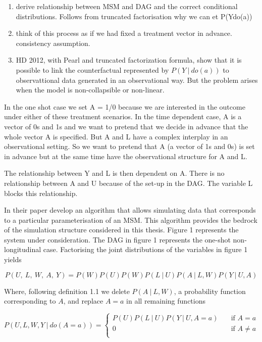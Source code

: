 \documentclass[11pt]{article}
\begin{document}
\begin{enumerate}
\def\labelenumi{\arabic{enumi}.}
\item
  derive relationship between MSM and DAG and the correct conditional
  distributions. Follows from truncated factorisation why we can et
  P(Y\textbar{}do(a))
\item
  think of this process as if we had fixed a treatment vector in
  advance. consistency assumption.
\item
  HD 2012, with Pearl and truncated factorization formula, show that it
  is possible to link the counterfactual represented by
  \(P(Y\ |\ do(a))\) to observattional data generated in an
  observational way. But the problem arises when the model is
  non-collapsible or non-linear.
\end{enumerate}

In the one shot case we set A = 1/0 because we are interested in the
outcome under either of these treatment scenarios. In the time dependent
case, A is a vector of 0s and 1s and we want to pretend that we decide
in advance that the whole vector A is specified. But A and L have a
complex interplay in an observational setting. So we want to pretend
that A (a vector of 1s and 0s) is set in advance but at the same time
have the observational structure for A and L.

The relationship between Y and L is then dependent on A. There is no
relationship between A and U because of the set-up in the DAG. The
variable L blocks this relationship.

In their paper \citet{Havercroft2012} develop an algorithm that allows
simulating data that corresponds to a particular parameterisation of an
MSM. This algorithm provides the bedrock of the simulation structure
considered in this thesis. Figure 1 represents the system under
consideration. The DAG in figure 1 represents the one-shot
non-longitudinal case. Factorising the joint distributions of the
variables in figure 1 yields

\[P(U,\ L,\ W,\ A,\ Y) = P(W)P(U)P(W)P(L\ |\ U)P(A\ |\ L,W)P(Y\ |\ U,A)\]

Where, following definition 1.1 we delete \(P(A\ |\ L,W)\), a
probability function corresponding to \(A\), and replace \(A=a\) in all
remaining functions

\[ P(U, L, W, Y\ |\ do(A=a)) =
  \begin{cases}
    P(U)P(L\ |\ U)P(Y\ |\ U,A = a) & \quad \text{if } A = a\\
    0  & \quad \text{if } A \neq a\\
  \end{cases}
\]
\end{document}
